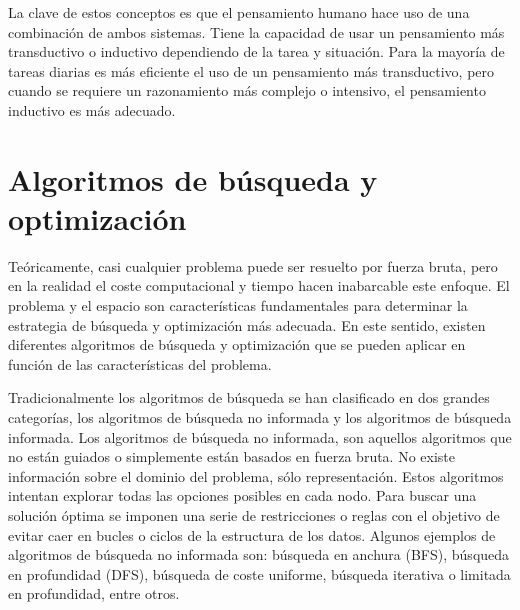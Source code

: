 \documentclass[11pt,a4paper,spanish]{book}
\numberwithin{equation}{chapter}
\numberwithin{figure}{chapter}
\begin{document}
La clave de estos conceptos es que el pensamiento humano hace uso de una combinación de ambos sistemas. Tiene la capacidad de usar un pensamiento más transductivo o
inductivo dependiendo de la tarea y situación. Para la mayoría de tareas diarias es más eficiente el uso de un pensamiento más transductivo, pero cuando se requiere un 
razonamiento más complejo o intensivo, el pensamiento inductivo es más adecuado.










\section{Algoritmos de búsqueda y optimización}

Teóricamente, casi cualquier problema puede ser resuelto por fuerza bruta, pero en la realidad el coste computacional y tiempo hacen inabarcable este enfoque. El problema y el espacio
son características fundamentales para determinar la estrategia de búsqueda y optimización más adecuada. En este sentido, existen diferentes algoritmos de búsqueda y optimización que se pueden aplicar
en función de las características del problema.

Tradicionalmente los algoritmos de búsqueda se han clasificado en dos grandes categorías, los algoritmos de búsqueda no informada y los algoritmos de búsqueda informada. Los
algoritmos de búsqueda no informada, son aquellos algoritmos que no están guiados o simplemente están basados en fuerza bruta. No existe información sobre el dominio del
problema, sólo representación. Estos algoritmos intentan explorar todas las opciones posibles en cada nodo. Para buscar una solución óptima
se imponen una serie de restricciones o reglas con el objetivo de evitar caer en bucles o ciclos de la estructura de los datos. Algunos ejemplos
de algoritmos de búsqueda no informada son: búsqueda en anchura (BFS), búsqueda en profundidad (DFS), 
búsqueda de coste uniforme, búsqueda iterativa o limitada en profundidad, entre otros.
\end{document}

